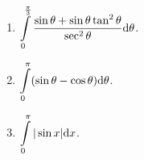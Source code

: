 \begin{multicols}{3}
\begin{enumerate}[ref={\fcProblemRef}]
\answer{$\left[ \right]_{}^{}=$}
\item $\displaystyle \int\limits_{0}^{\frac{\pi}{3}} \frac{\sin \theta +\sin \theta \tan^2\theta}{\sec^2\theta} {\normalfont \text{d}} \theta$.

\answer{$\left[ \right]_{}^{}=$}
\item $\displaystyle \int\limits_{0}^{\pi} (\sin \theta -\cos \theta) {\normalfont \text{d}} \theta$.

\answer{$\left[ \right]_{}^{}=$}
\item $\displaystyle \int\limits_{0}^{\pi}|\sin x| {\normalfont \text{d}} x$.
\end{enumerate}
\end{multicols}
